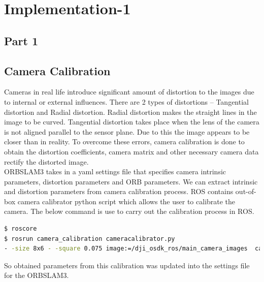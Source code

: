 \chapter{Implementation-1}
\label{ch:implementation}
\section*{Part 1}
\label{sec:implemenation:part1}
\section{Camera Calibration}
\label{sec:camcalib}
Cameras in real life introduce significant amount of distortion to the images due to internal or external influences. There are 2 types of distortions – Tangential distortion and Radial distortion. Radial distortion makes the straight lines in the image to be curved. Tangential distortion takes place when the lens of the camera is not aligned parallel to the sensor plane. Due to this the image appears to be closer than in reality. To overcome these errors, camera calibration is done to obtain the distortion coefficients, camera matrix and other necessary camera data rectify the distorted image.\\

ORBSLAM3 takes in a yaml settings file that specifies camera intrinsic parameters, distortion parameters and ORB parameters. We can extract intrinsic and distortion parameters from camera calibration process.
ROS contains out-of-box camera calibrator python script which allows the user to calibrate the camera.  The below command is use to carry out the calibration process in ROS.
\begin{lstlisting}[language=bash, basicstyle=\small]
$ roscore
$ rosrun camera_calibration cameracalibrator.py  
- -size 8x6 - -square 0.075 image:=/dji_osdk_ros/main_camera_images  camera:=/camera
\end{lstlisting} 

So obtained parameters from this calibration was updated into the settings file for the ORBSLAM3.

